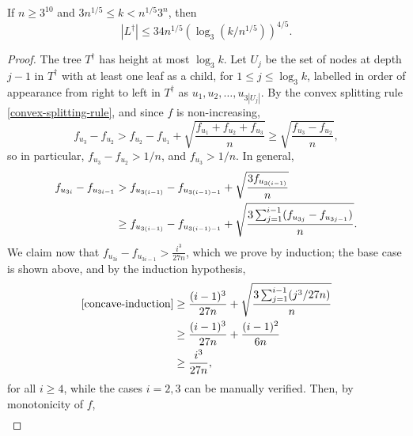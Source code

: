 \begin{prop}
  If $n \ge 3^{10}$ and $3 n^{1/5} \le k < n^{1/5} 3^n$, then
  \[
    |L^\dagger| \le 34 n^{1/5} {\left( \log_3 (k/n^{1/5})\right)}^{4/5} .
  \]
\end{prop}
\begin{proof}
  The tree $T^\dagger$ has height at most $\log_3 k$. Let $U_j$ be the
  set of nodes at depth $j - 1$ in $T^\dagger$ with at least one leaf
  as a child, for $1 \le j \le \log_3 k$, labelled in order of
  appearance from right to left in $T^\dagger$ as
  $u_1, u_2, \dots, u_{3 |U_j|}$.
  By the convex splitting rule \eqref{convex-splitting-rule}, and
  since $f$ is non-increasing,
  \[
    f_{u_3} - f_{u_2} > f_{u_2} - f_{u_1} + \sqrt{\frac{f_{u_1} + f_{u_2} +
        f_{u_3}}{n}} \ge \sqrt{\frac{f_{u_3} - f_{u_2}}{n}} ,
  \]
  so in particular, $f_{u_3} - f_{u_2} > 1/n$, and $f_{u_3} > 1/n$. In
  general,
  \begin{align}
    f_{u_{3i}} - f_{u_{3i - 1}} &> f_{u_{3(i - 1)}} - f_{u_{3(i - 1) - 1}} + \sqrt{ \frac{3 f_{u_{3(i - 1)}}}{n}} \notag \\
                                &\ge f_{u_{3(i - 1)}} - f_{u_{3(i - 1) - 1}} + \sqrt{\frac{3 \sum_{j = 1}^{i - 1} (f_{u_{3j}} - f_{u_{3j - 1}})}{n}} . \eqlabel{concave-induction}
  \end{align}
  We claim now that $f_{u_{3i}} - f_{u_{3i - 1}} > \frac{i^3}{27n}$,
  which we prove by induction; the base case is shown above, and by
  the induction hypothesis,
  \begin{align*}
    \eqref{concave-induction} &\ge \frac{(i - 1)^3}{27n} + \sqrt{\frac{3 \sum_{j = 1}^{i - 1} (j^3/27n)}{n}} \\
                              &\ge \frac{(i - 1)^3}{27n} + \frac{(i - 1)^2}{6n} \\
                              &\ge \frac{i^3}{27n} ,
  \end{align*}
  for all $i \ge 4$, while the cases $i = 2, 3$ can be manually
  verified. Then, by monotonicity of $f$,
  \begin{align}

\end{align}
\end{proof}
